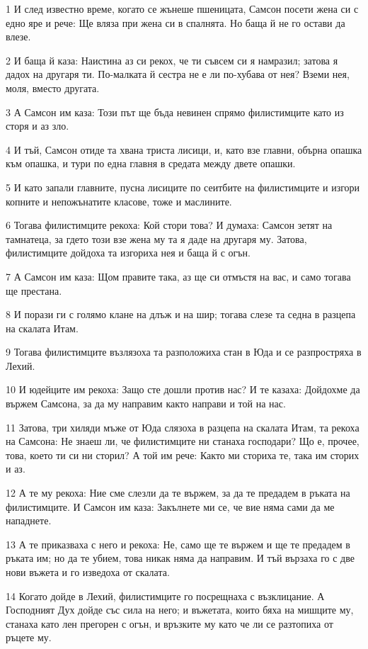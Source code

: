 \par 1 И след известно време, когато се жънеше пшеницата, Самсон посети жена си с едно яре и рече: Ще вляза при жена си в спалнята. Но баща й не го остави да влезе.
\par 2 И баща й каза: Наистина аз си рекох, че ти съвсем си я намразил; затова я дадох на другаря ти. По-малката й сестра не е ли по-хубава от нея? Вземи нея, моля, вместо другата.
\par 3 А Самсон им каза: Този път ще бъда невинен спрямо филистимците като из сторя и аз зло.
\par 4 И тъй, Самсон отиде та хвана триста лисици, и, като взе главни, обърна опашка към опашка, и тури по една главня в средата между двете опашки.
\par 5 И като запали главните, пусна лисиците по сеитбите на филистимците и изгори копните и непожънатите класове, тоже и маслините.
\par 6 Тогава филистимците рекоха: Кой стори това? И думаха: Самсон зетят на тамнатеца, за гдето този взе жена му та я даде на другаря му. Затова, филистимците дойдоха та изгориха нея и баща й с огън.
\par 7 А Самсон им каза: Щом правите така, аз ще си отмъстя на вас, и само тогава ще престана.
\par 8 И порази ги с голямо клане на длъж и на шир; тогава слезе та седна в разцепа на скалата Итам.
\par 9 Тогава филистимците възлязоха та разположиха стан в Юда и се разпростряха в Лехий.
\par 10 И юдейците им рекоха: Защо сте дошли против нас? И те казаха: Дойдохме да вържем Самсона, за да му направим както направи и той на нас.
\par 11 Затова, три хиляди мъже от Юда слязоха в разцепа на скалата Итам, та рекоха на Самсона: Не знаеш ли, че филистимците ни станаха господари? Що е, прочее, това, което ти си ни сторил? А той им рече: Както ми сториха те, така им сторих и аз.
\par 12 А те му рекоха: Ние сме слезли да те вържем, за да те предадем в ръката на филистимците. И Самсон им каза: Закълнете ми се, че вие няма сами да ме нападнете.
\par 13 А те приказваха с него и рекоха: Не, само ще те вържем и ще те предадем в ръката им; но да те убием, това никак няма да направим. И тъй вързаха го с две нови въжета и го изведоха от скалата.
\par 14 Когато дойде в Лехий, филистимците го посрещнаха с възклицание. А Господният Дух дойде със сила на него; и въжетата, които бяха на мишците му, станаха като лен прегорен с огън, и връзките му като че ли се разтопиха от ръцете му.
